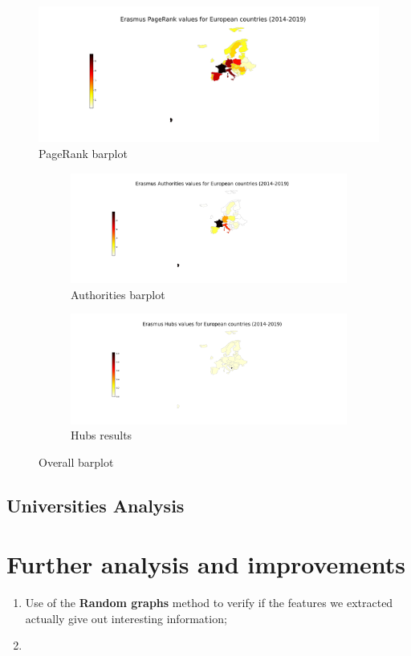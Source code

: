     \begin{figure}[hbtp]
        \centering
          \includegraphics[width=0.5\linewidth]{../geoMaps/PR_geoMap.png}
          \caption{PageRank barplot}
         \label{fig:1}
        \end{figure}
    
    \begin{figure}[hbtp]
        \hfill
        \begin{subfigure}{0.5\linewidth}
          \centering
          \includegraphics[width=\linewidth]{../geoMaps/Auth_geoMap.png}
          \caption{Authorities barplot}
          \label{fig:2}
        \end{subfigure}%
        \hfill
        \begin{subfigure}{0.5\linewidth}
          \centering
          \includegraphics[width=\linewidth]{../geoMaps/Hubs_geoMap.png}
          \caption{Hubs results}
          \label{fig:3}
        \end{subfigure}
        \caption{Overall barplot}
        \label{fig:overall}
      \end{figure}      

    \subsection*{Universities Analysis}
    
    \section{Further analysis and improvements}
    \begin{enumerate}
        \item Use of the \textbf{Random graphs} method to verify if the features we extracted actually give out interesting information;
        \item 
    \end{enumerate} 
    